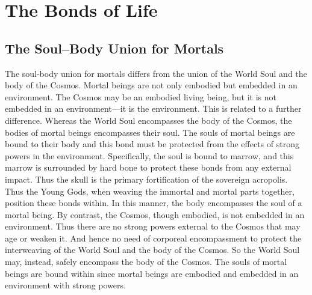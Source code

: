
\chapter{The Bonds of Life} %
\label{cha:the_bonds_of_life}

\section{The Soul--Body Union for Mortals} %
\label{sec:the_soul_body_union_in_mortals}

The soul-body union for mortals differs from the union of the World Soul and the body of the Cosmos. Mortal beings are not only embodied but embedded in an environment. The Cosmos may be an embodied living being, but it is not embedded in an environment---it is the environment. This is related to a further difference. Whereas the World Soul encompasses the body of the Cosmos, the bodies of mortal beings encompasses their soul. The souls of mortal beings are bound to their body and this bond must be protected from the effects of strong powers in the environment. Specifically, the soul is bound to marrow, and this marrow is surrounded by hard bone to protect these bonds from any external impact. Thus the skull is the primary fortification of the sovereign acropolis. Thus the Young Gods, when weaving the immortal and mortal parts together, position these bonds within. In this manner, the body encompasses the soul of a mortal being. By contrast, the Cosmos, though embodied, is not embedded in an environment. Thus there are no strong powers external to the Cosmos that may age or weaken it. And hence no need of corporeal encompassment to protect the interweaving of the World Soul and the body of the Cosmos. So the World Soul may, instead, safely encompass the body of the Cosmos. The souls of mortal beings are bound within since mortal beings are embodied and embedded in an environment with strong powers.

